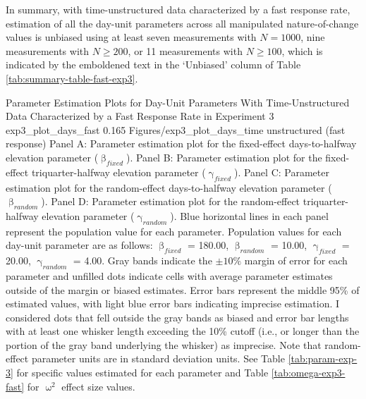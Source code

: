 \documentclass[
12pt, %
twoside,
english]{guelphthesis}
\begin{document}
In summary, with time-unstructured data characterized by a fast response rate, estimation of all the day-unit parameters across all manipulated nature-of-change values is unbiased using at least seven measurements with \(N = 1000\), nine measurements with \(N \ge 200\), or 11 measurements with \(N \ge 100\), which is indicated by the emboldened text in the `Unbiased' column of Table \ref{tab:summary-table-fast-exp3}.
\begin{apaFigure}
[portrait]
[samepage]
[-0.2cm]
{Parameter Estimation Plots for Day-Unit Parameters With Time-Unstructured Data Characterized by a Fast Response Rate in Experiment 3}
{exp3_plot_days_fast}
{0.165}
{Figures/exp3_plot_days_time unstructured (fast response)}
{Panel A: Parameter estimation plot for the fixed-effect days-to-halfway elevation parameter ($\upbeta_{fixed}$). Panel B: Parameter estimation plot for the fixed-effect triquarter-halfway elevation parameter ($\upgamma_{fixed}$). Panel C: Parameter estimation plot for the random-effect days-to-halfway elevation parameter ($\upbeta_{random}$). Panel D: Parameter estimation plot for the random-effect triquarter-halfway elevation parameter ($\upgamma_{random}$). Blue horizontal lines in each panel represent the population value for each parameter. Population values for each day-unit parameter are as follows: $\upbeta_{fixed}$ = 180.00, $\upbeta_{random}$ = 10.00, $\upgamma_{fixed}$ = 20.00, $\upgamma_{random}$ = 4.00. Gray bands indicate the $\pm 10\%$ margin of error for each parameter and unfilled dots indicate cells with average parameter estimates outside of the margin or biased estimates. Error bars represent the middle 95\% of estimated values, with light blue error bars indicating imprecise estimation. I considered dots that fell outside the gray bands as biased and error bar lengths with at least one whisker length exceeding the 10\% cutoff (i.e., or longer than the portion of the gray band underlying the whisker) as imprecise. Note that random-effect parameter units are in standard deviation units. See Table \ref{tab:param-exp-3} for specific values estimated for each parameter and Table \ref{tab:omega-exp3-fast} for $\upomega^2$ effect size values.}
\end{apaFigure}
\end{document}
